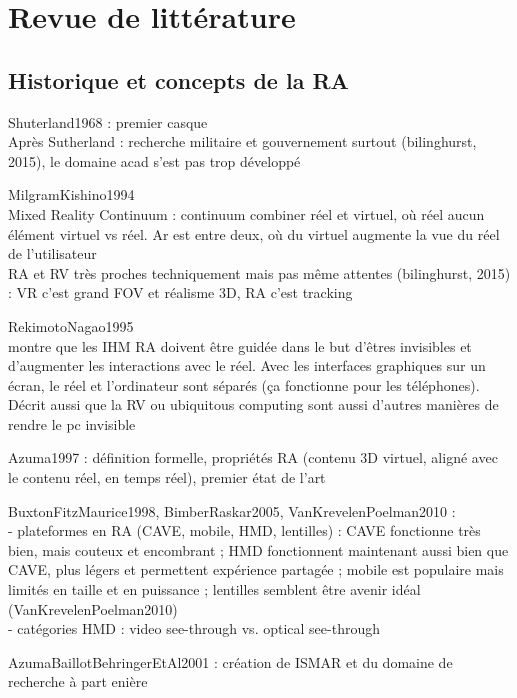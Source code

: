 \chapter{Revue de littérature}
\label{ch:litterature}

\section{Historique et concepts de la RA}
Shuterland1968 : premier casque\\

Après Sutherland : recherche militaire et gouvernement surtout (bilinghurst, 2015), le domaine acad s'est pas trop développé

MilgramKishino1994\\
Mixed Reality Continuum : continuum combiner réel et virtuel, où réel aucun élément virtuel vs réel. Ar est entre deux, où du virtuel augmente la vue du réel de l'utilisateur\\
RA et RV très proches techniquement mais pas même attentes (bilinghurst, 2015) : VR c'est grand FOV et réalisme 3D, RA c'est tracking

RekimotoNagao1995\\
montre que les IHM RA doivent être guidée dans le but d'êtres invisibles et d'augmenter les interactions avec le réel. Avec les interfaces graphiques sur un écran, le réel et l'ordinateur sont séparés (ça fonctionne pour les téléphones). Décrit aussi que la RV ou ubiquitous computing sont aussi d'autres manières de rendre le pc invisible

Azuma1997 : définition formelle, propriétés RA (contenu 3D virtuel, aligné avec le contenu réel, en temps réel), premier état de l'art

BuxtonFitzMaurice1998, BimberRaskar2005, VanKrevelenPoelman2010 :\\
- plateformes en RA (CAVE, mobile, HMD, lentilles) : CAVE fonctionne très bien, mais couteux et encombrant ; HMD fonctionnent maintenant aussi bien que CAVE, plus légers et permettent expérience partagée ; mobile est populaire mais limités en taille et en puissance ; lentilles semblent être avenir idéal (VanKrevelenPoelman2010)\\
- catégories HMD : video see-through vs. optical see-through

AzumaBaillotBehringerEtAl2001 : création de ISMAR et du domaine de recherche à part enière

